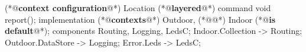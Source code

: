 \begin{Sbox}
\begin{minipage}{\marginparwidth}
\begin{csource}
(*@\textbf{context configuration}@*) Location {
(*@\textbf{layered}@*) command void report();}
implementation {
(*@\textbf{contexts}@*) Outdoor,
(*@@*) Indoor (*@\textbf{is default}@*);
 components Routing, Logging, 
 LedsC;
 Indoor.Collection -> Routing;
 Outdoor.DataStore -> Logging;
 Error.Leds -> LedsC;}
\end{csource}
\end{minipage}
\end{Sbox}

